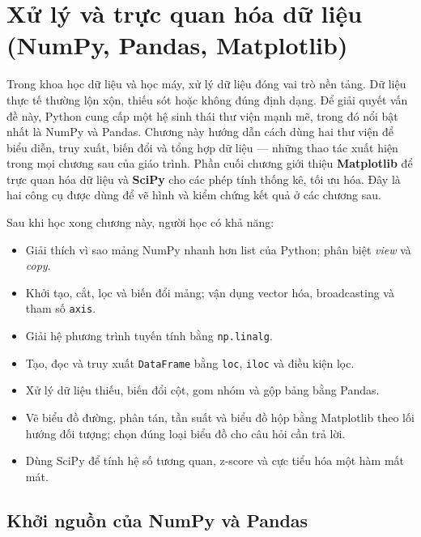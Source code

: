 
\chapter{Xử lý và trực quan hóa dữ liệu \\ (NumPy, Pandas, Matplotlib)}
\label{chap:numpy-pandas}

Trong khoa học dữ liệu và học máy, xử lý dữ liệu đóng vai trò nền tảng. Dữ liệu thực tế thường lộn xộn, thiếu sót hoặc không đúng định dạng. Để giải quyết vấn đề này, Python cung cấp một hệ sinh thái thư viện mạnh mẽ, trong đó nổi bật nhất là NumPy và Pandas. Chương này hướng dẫn cách dùng hai thư viện để biểu diễn, truy xuất, biến đổi và tổng hợp dữ liệu --- những thao tác xuất hiện trong mọi chương sau của giáo trình. Phần cuối chương giới thiệu \textbf{Matplotlib} để trực quan hóa dữ liệu và \textbf{SciPy} cho các phép tính thống kê, tối ưu hóa. Đây là hai công cụ được dùng để vẽ hình và kiểm chứng kết quả ở các chương sau.

\noindent Sau khi học xong chương này, người học có khả năng:
\begin{itemize}
    \item Giải thích vì sao mảng NumPy nhanh hơn list của Python; phân biệt \textit{view} và \textit{copy}.
    \item Khởi tạo, cắt, lọc và biến đổi mảng; vận dụng vector hóa, broadcasting và tham số \texttt{axis}.
    \item Giải hệ phương trình tuyến tính bằng \texttt{np.linalg}.
    \item Tạo, đọc và truy xuất \texttt{DataFrame} bằng \texttt{loc}, \texttt{iloc} và điều kiện lọc.
    \item Xử lý dữ liệu thiếu, biến đổi cột, gom nhóm và gộp bảng bằng Pandas.
    \item Vẽ biểu đồ đường, phân tán, tần suất và biểu đồ hộp bằng Matplotlib theo lối hướng đối tượng; chọn đúng loại biểu đồ cho câu hỏi cần trả lời.
    \item Dùng SciPy để tính hệ số tương quan, z-score và cực tiểu hóa một hàm mất mát.
\end{itemize}

\section{Khởi nguồn của NumPy và Pandas}

